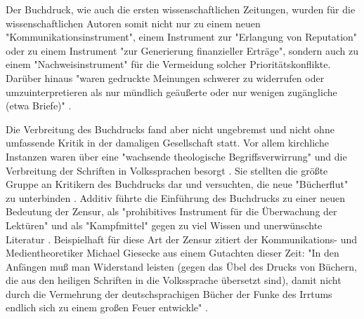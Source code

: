 Der Buchdruck, wie auch die ersten wissenschaftlichen Zeitungen, wurden für die wissenschaftlichen Autoren somit nicht nur zu einem neuen "Kommunikationsinstrument", einem Instrument zur "Erlangung von Reputation" oder zu einem Instrument "zur Generierung finanzieller Erträge", sondern auch zu einem "Nachweisinstrument" \cite{Wunderlich_2008} \cite{Schirmbacher_2009} für die Vermeidung solcher Prioritätskonflikte. Darüber hinaus "waren gedruckte Meinungen schwerer zu widerrufen oder umzuinterpretieren als nur mündlich geäußerte oder nur wenigen zugängliche (etwa Briefe)" \cite{Luhmann_1997}.

Die Verbreitung des Buchdrucks fand aber nicht ungebremst und nicht ohne umfassende Kritik in der damaligen Gesellschaft statt. Vor allem kirchliche Instanzen waren über eine "wachsende theologische Begriffsverwirrung" und die Verbreitung der Schriften in Volkssprachen besorgt \cite{Giesecke_1991}. Sie stellten die größte Gruppe an Kritikern des Buchdrucks dar und versuchten, die neue "Bücherflut" zu unterbinden \cite{Giesecke_1991}. Additiv führte die Einführung des Buchdrucks zu einer neuen Bedeutung der Zensur, als "prohibitives Instrument für die Überwachung der Lektüren" und als "Kampfmittel" \cite{Besch_1998} gegen zu viel Wissen und unerwünschte Literatur \cite{Giesecke_1991}. Beispielhaft für diese Art der Zensur zitiert der Kommunikations- und Medientheoretiker Michael Giesecke aus einem Gutachten dieser Zeit: "In den Anfängen muß man Widerstand leisten (gegen das Übel des Drucks von Büchern, die aus den heiligen Schriften in die Volkssprache übersetzt sind), damit nicht durch die Vermehrung der deutschsprachigen Bücher der Funke des Irrtums endlich sich zu einem großen Feuer entwickle" \cite{Giesecke_1991}.

